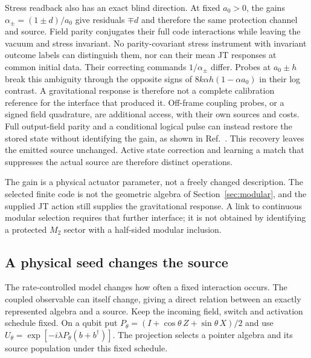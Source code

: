 \documentclass[12pt,a4paper]{article}
\begin{document}
Stress readback also has an exact blind direction. At fixed $a_0>0$,
the gains $\alpha_\pm=(1\pm d)/a_0$ give residuals $\mp d$ and therefore
the same protection channel and source. Field parity conjugates their
full code interactions while leaving the vacuum and stress invariant.
No parity-covariant stress instrument with invariant outcome labels can
distinguish them, nor can their mean JT responses at common initial data.
Their correcting commands $1/\alpha_\pm$ differ. Probes at $a_0\pm h$
break this ambiguity through the opposite signs of
$8k\alpha h(1-\alpha a_0)$ in their log contrast. A gravitational
response is therefore not a complete calibration reference for the
interface that produced it. Off-frame coupling probes, or a signed
field quadrature, are additional access, with their own sources and costs.
Full output-field parity and a conditional logical pulse can instead
restore the stored state without identifying the gain, as shown in
Ref.~\cite{BrainAnchor}. This recovery leaves the emitted source
unchanged. Active state correction and learning a match that suppresses
the actual source are therefore distinct operations.

The gain is a physical actuator parameter, not a freely changed
description. The selected finite code is not the geometric algebra of
Section~\ref{sec:modular}, and the supplied JT action still supplies the
gravitational response. A link to continuous modular selection requires
that further interface; it is not obtained by identifying a protected
$M_2$ sector with a half-sided modular inclusion.


\subsection{A physical seed changes the source}
\label{sec:projection-source}

The rate-controlled model changes how often a fixed interaction occurs. The coupled
observable can itself change, giving a direct relation between an exactly represented
algebra and a source. Keep the incoming field, switch and activation schedule fixed.
On a qubit put $P_\theta=(I+\cos\theta\,Z+\sin\theta\,X)/2$ and use
$U_\theta=\exp[-i\lambda P_\theta(b+b^\dagger)]$. The projection selects a pointer
algebra and its source population under this fixed schedule.
\end{document}
